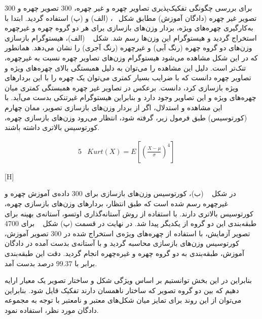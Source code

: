 برای بررسی چگونگی تفکیک‌پذیری تصاویر چهره و غیر چهره، 300 تصویر چهره و 300 تصویر غیر چهره (دادگان آموزش) مطابق شکل ~، (الف) و (پ) استفاده گردید. ابتدا با به‌کارگیری چهره‌های ویژه، بردار وزن‌های بازسازی برای هر دو گروه چهره و غیرچهره استخراج گردید و هیستوگرام این وزن‌ها رسم شد. شکل   ~ (الف)، هیستوگرام بازسازی وزن‌های دو گروه چهره (رنگ آبی) و غیرچهره (رنگ آجری) را نشان می‌دهد. همانطور که در این شکل مشاهده می‌شود هیستوگرام وزن‌های تصاویر چهره نسبت به غیرچهره، تنک‌تر است. دلیل این مشاهده را می‌توان به دلیل همبستگی بالای چهره‌های ویژه و تصاویر چهره دانست که با ضرایب بسیار کمتری می‌توان یک چهره را با این بردارهای ویژه بازسازی کرد، دانست. برعکس در تصاویر غیر چهره همبستگی کمتری میان چهره‌های ویژه و این تصاویر وجود دارد و بنابراین هیستوگرام غیرتنکی بدست می‌آید. با این مشاهده و استدلال، اگر از بردار وزن‌های بازسازی تصویر، ممان چهارم (کورتوسیس) طبق فرمول زیر، گرفته شود، انتظار می‌رود وزن‌های بازسازی چهره، کورتوسیس بالاتری داشته باشند.

\begin{alignat}{5}
	& Kurt(X) = E \left[\left(\frac{X-\mu}{\sigma}\right)^4\right] \label{kurtosis} && 
\end{alignat}


[H]


در شکل ~ (ب)، کورتوسیس وزن‌های بازسازی برای 300 داده‌‌ی آموزش چهره و غیرچهره رسم شده است که طبق انتظار، بردارهای وزن‌های بازسازی چهره، کورتوسیس بالاتری دارند. با استفاده از روش آستانه‌گذاری اوتسو، آستانه‌ی بهینه برای طبقه‌بندی این دو گروه از یکدیگر پیدا شد. در نهایت در قسمت (پ) شکل ~ برای 4700 تصویر آزمایش، با استفاده از چهره‌های ویژه‌ی استخراج شده در 300 تصویر آموزش، کورتوسیس وزن‌های بازسازی محاسبه گردید و با آستانه‌ی بدست آمده در دادگان آموزش، طبقه‌بندی به دو گروه چهره و غیره‌چهره انجام گردید. دقت این طبقه‌بندی برابر با $99.37$ درصد بدست آمد. 

بنابراین در این بخش توانستیم بر اساس ویژگی شکل و ساختار تصویر یک معیار ارایه دهیم که بین دو گروه تصویر که ساختار ناهمسان دارند تفکیک قایل شود. بنابراین می‌توان از این روند برای تمایز میان شکل‌های معتبر و نامعتبر با توجه به مجموعه دادگان مورد نظر، استفاده نمود.

